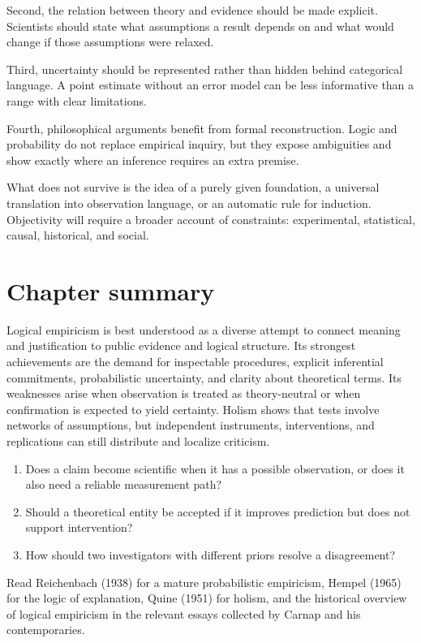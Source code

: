 Second, the relation between theory and evidence should be made explicit.
Scientists should state what assumptions a result depends on and what would
change if those assumptions were relaxed.

Third, uncertainty should be represented rather than hidden behind categorical
language. A point estimate without an error model can be less informative than
a range with clear limitations.

Fourth, philosophical arguments benefit from formal reconstruction. Logic and
probability do not replace empirical inquiry, but they expose ambiguities and
show exactly where an inference requires an extra premise.

What does not survive is the idea of a purely given foundation, a universal
translation into observation language, or an automatic rule for induction.
Objectivity will require a broader account of constraints: experimental,
statistical, causal, historical, and social.

\section*{Chapter summary}

Logical empiricism is best understood as a diverse attempt to connect meaning
and justification to public evidence and logical structure. Its strongest
achievements are the demand for inspectable procedures, explicit inferential
commitments, probabilistic uncertainty, and clarity about theoretical terms.
Its weaknesses arise when observation is treated as theory-neutral or when
confirmation is expected to yield certainty. Holism shows that tests involve
networks of assumptions, but independent instruments, interventions, and
replications can still distribute and localize criticism.

\begin{discussion}
\begin{enumerate}
\item Does a claim become scientific when it has a possible observation, or
does it also need a reliable measurement path?
\item Should a theoretical entity be accepted if it improves prediction but
does not support intervention?
\item How should two investigators with different priors resolve a disagreement?
\end{enumerate}
\end{discussion}

\begin{furtherreading}
Read Reichenbach (1938) for a mature probabilistic empiricism, Hempel (1965)
for the logic of explanation, Quine (1951) for holism, and the historical
overview of logical empiricism in the relevant essays collected by Carnap and
his contemporaries.
\end{furtherreading}

